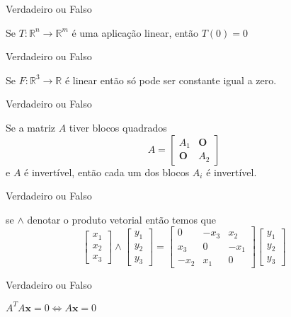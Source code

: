 \documentclass{beamer}
\begin{document}
\begin{frame}{Verdadeiro ou Falso}
  \begin{block}{1}
Se $T: \mathbb{R}^n \to \mathbb{R}^m$ é uma aplicação linear, então $T(0)=0$
\end{block}
\end{frame}

\begin{frame}{Verdadeiro ou Falso}
  \begin{block}{2}
  Se $F:\mathbb{R}^3 \to \mathbb{R}$ é linear então só pode ser constante igual a zero.
\end{block}
\end{frame}

\begin{frame}{Verdadeiro ou Falso}
  \begin{block}{3}
  Se a matriz $A$ tiver blocos quadrados
  $$ A = \begin{bmatrix}
    A_1 & \mathbf{O} \\
    \mathbf{O} & A_2
  \end{bmatrix}$$ e $A$ é invertível, então cada um dos blocos $A_i$ é invertível.
\end{block}
\end{frame}   

\begin{frame}{Verdadeiro ou Falso}
  \begin{block}{4}
  se $\wedge$ denotar o produto vetorial então temos que
  $$\begin{bmatrix}
    x_1 \\ x_2 \\ x_3 
  \end{bmatrix} \wedge \begin{bmatrix}
    y_1 \\ y_2 \\ y_3
  \end{bmatrix} = \begin{bmatrix}
    0 & -x_3 & x_2 \\
    x_3 & 0 & -x_1 \\
    -x_2  & x_1 &0
  \end{bmatrix}\begin{bmatrix}
    y_1 \\ y_2 \\ y_3
  \end{bmatrix}
  $$
\end{block}
\end{frame}

\begin{frame}{Verdadeiro ou Falso}
  \begin{block}{5}
$A^TA\mathbf{x}=0 \iff A\mathbf{x}=0$
\end{block}
\end{frame}
\end{document}
